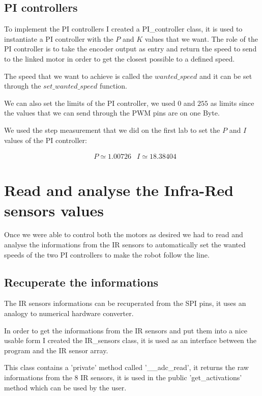 \subsection*{PI controllers}

To implement the PI controllers I created a PI\_controller class, it is used to instantiate a PI controller with the $P$ and $K$ values that we want.
The role of the PI controller is to take the encoder output as entry and return the speed to send to the linked motor in order to get the closest possible to a defined speed.

The speed that we want to achieve is called the $wanted\_speed$ and it can be set through the $set\_wanted\_speed$ function.

We can also set the limits of the PI controller, we used $0$ and $255$ as limits since the values that we can send through the PWM pins are on one Byte.

We used the step measurement that we did on the first lab to set the $P$ and $I$ values of the PI controller:

\begin{align*}
    &P \simeq 1.00726
    &I \simeq 18.38404
\end{align*}

\section*{Read and analyse the Infra-Red sensors values}

Once we were able to control both the motors as desired we had to read and analyse the informations from the IR sensors to automatically set the wanted speeds of the two PI controllers to make the robot follow the line.

\subsection*{Recuperate the informations}

The IR sensors informations can be recuperated from the SPI pins, it uses an analogy to numerical hardware converter.

In order to get the informations from the IR sensors and put them into a nice usable form I created the IR\_sensors class, it is used as an interface between the program and the IR sensor array.

This class contains a 'private' method called '\_\_adc\_read', it returns the raw informations from the 8 IR sensors, it is used in the public 'get\_activations' method which can be used by the user.

